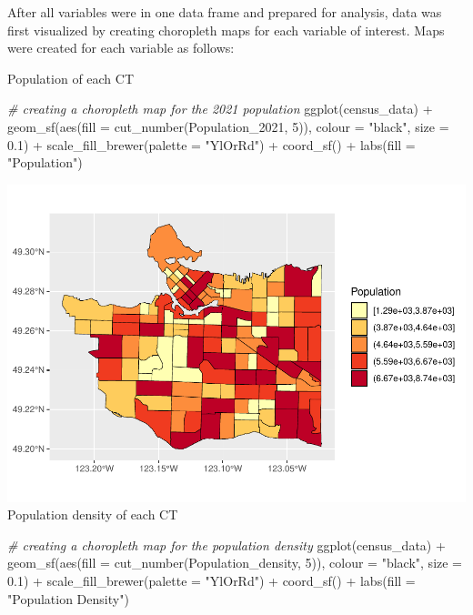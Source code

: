 \documentclass[
]{article}
\newenvironment{Shaded}{\begin{snugshade}}{\end{snugshade}}
\newcommand{\AttributeTok}[1]{\textcolor[rgb]{0.77,0.63,0.00}{#1}}
\newcommand{\CommentTok}[1]{\textcolor[rgb]{0.56,0.35,0.01}{\textit{#1}}}
\newcommand{\DecValTok}[1]{\textcolor[rgb]{0.00,0.00,0.81}{#1}}
\newcommand{\FloatTok}[1]{\textcolor[rgb]{0.00,0.00,0.81}{#1}}
\newcommand{\FunctionTok}[1]{\textcolor[rgb]{0.00,0.00,0.00}{#1}}
\newcommand{\NormalTok}[1]{#1}
\newcommand{\SpecialCharTok}[1]{\textcolor[rgb]{0.00,0.00,0.00}{#1}}
\newcommand{\StringTok}[1]{\textcolor[rgb]{0.31,0.60,0.02}{#1}}
\begin{document}
After all variables were in one data frame and prepared for analysis,
data was first visualized by creating choropleth maps for each variable
of interest. Maps were created for each variable as follows:

Population of each CT

\begin{Shaded}
\begin{Highlighting}[]
\CommentTok{\# creating a choropleth map for the 2021 population}
\FunctionTok{ggplot}\NormalTok{(census\_data) }\SpecialCharTok{+}
  \FunctionTok{geom\_sf}\NormalTok{(}\FunctionTok{aes}\NormalTok{(}\AttributeTok{fill =} \FunctionTok{cut\_number}\NormalTok{(Population\_2021, }\DecValTok{5}\NormalTok{)),}
          \AttributeTok{colour =} \StringTok{"black"}\NormalTok{,}
          \AttributeTok{size =} \FloatTok{0.1}\NormalTok{) }\SpecialCharTok{+}
  \FunctionTok{scale\_fill\_brewer}\NormalTok{(}\AttributeTok{palette =} \StringTok{"YlOrRd"}\NormalTok{) }\SpecialCharTok{+}
  \FunctionTok{coord\_sf}\NormalTok{() }\SpecialCharTok{+}
  \FunctionTok{labs}\NormalTok{(}\AttributeTok{fill =} \StringTok{"Population"}\NormalTok{)}
\end{Highlighting}
\end{Shaded}

\includegraphics{4GA3Markdown_files/figure-latex/unnamed-chunk-22-1.pdf}
Population density of each CT

\begin{Shaded}
\begin{Highlighting}[]
\CommentTok{\# creating a choropleth map for the population density}
\FunctionTok{ggplot}\NormalTok{(census\_data) }\SpecialCharTok{+}
  \FunctionTok{geom\_sf}\NormalTok{(}\FunctionTok{aes}\NormalTok{(}\AttributeTok{fill =} \FunctionTok{cut\_number}\NormalTok{(Population\_density, }\DecValTok{5}\NormalTok{)),}
          \AttributeTok{colour =} \StringTok{"black"}\NormalTok{,}
          \AttributeTok{size =} \FloatTok{0.1}\NormalTok{) }\SpecialCharTok{+}
  \FunctionTok{scale\_fill\_brewer}\NormalTok{(}\AttributeTok{palette =} \StringTok{"YlOrRd"}\NormalTok{) }\SpecialCharTok{+}
  \FunctionTok{coord\_sf}\NormalTok{() }\SpecialCharTok{+}
  \FunctionTok{labs}\NormalTok{(}\AttributeTok{fill =} \StringTok{"Population Density"}\NormalTok{)}
\end{Highlighting}
\end{Shaded}
\end{document}
